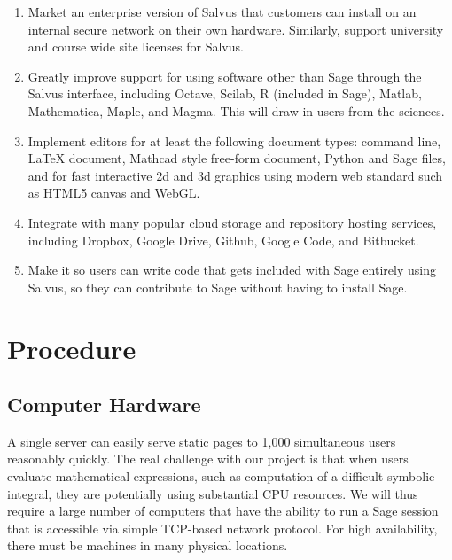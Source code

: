 \documentclass[11pt]{article}
\begin{document}
\begin{enumerate}
\item Market an enterprise version of Salvus that customers can
  install on an internal secure network on their own hardware.
  Similarly, support university and course wide site licenses for
  Salvus.
\item Greatly improve support for using software other than Sage
  through the Salvus interface, including Octave, Scilab, R (included
  in Sage), Matlab, Mathematica, Maple, and Magma. This will draw in
  users from the sciences.
\item Implement editors for at least the following document types:
  command line, \LaTeX{} document, Mathcad style free-form document,
  Python and Sage files, and for fast interactive 2d and 3d graphics
  using modern web standard such as HTML5 canvas and WebGL.
\item Integrate with many popular cloud storage and repository hosting
  services, including Dropbox, Google Drive, Github, Google Code, and
  Bitbucket.
\item Make it so users can write code that
  gets included with Sage entirely using Salvus, so they can
  contribute to Sage without having to install Sage.
\end{enumerate}


\section{Procedure}


\subsection{Computer Hardware}
A single server can easily serve static pages to 1,000 simultaneous
users reasonably quickly.  The real challenge with our project is that
when users evaluate mathematical expressions, such as computation of a
difficult symbolic integral, they are potentially using substantial
CPU resources.  We will thus require a large number of computers that
have the ability to run a Sage session that is accessible via simple
TCP-based network protocol.  For high availability, there must be
machines in many physical locations.
\end{document}
